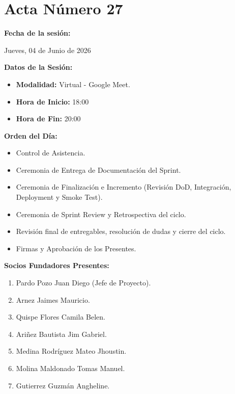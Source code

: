 \newpage
\section{Acta Número 27}
\label{sec:acta27}

\noindent \textbf{Fecha de la sesión:}\par
Jueves, 04 de Junio de 2026

\vspace*{0.5cm}
\noindent \textbf{Datos de la Sesión:}
\vspace{-0.2cm}
\begin{itemize}[noitemsep]
    \item \textbf{Modalidad:} Virtual - Google Meet.
    \item \textbf{Hora de Inicio:} 18:00
    \item \textbf{Hora de Fin:} 20:00
\end{itemize}

\vspace*{0.5cm}
\noindent \textbf{Orden del Día:}
\vspace{-0.2cm}
\begin{itemize}[noitemsep]
    \item Control de Asistencia.
    \item Ceremonia de Entrega de Documentación del Sprint.
    \item Ceremonia de Finalización e Incremento (Revisión DoD, Integración, Deployment y Smoke Test).
    \item Ceremonia de Sprint Review y Retrospectiva del ciclo.
    \item Revisión final de entregables, resolución de dudas y cierre del ciclo.
    \item Firmas y Aprobación de los Presentes.
\end{itemize}

\vspace*{0.5cm}
\noindent \textbf{Socios Fundadores Presentes:}
\vspace{-0.2cm}
\begin{enumerate}[noitemsep]
    \item Pardo Pozo Juan Diego (Jefe de Proyecto).
    \item Arnez Jaimes Mauricio.
    \item Quispe Flores Camila Belen.
    \item Ariñez Bautista Jim Gabriel.
    \item Medina Rodríguez Mateo Jhoustin.
    \item Molina Maldonado Tomas Manuel.
    \item Gutierrez Guzmán Angheline.
\end{enumerate}

